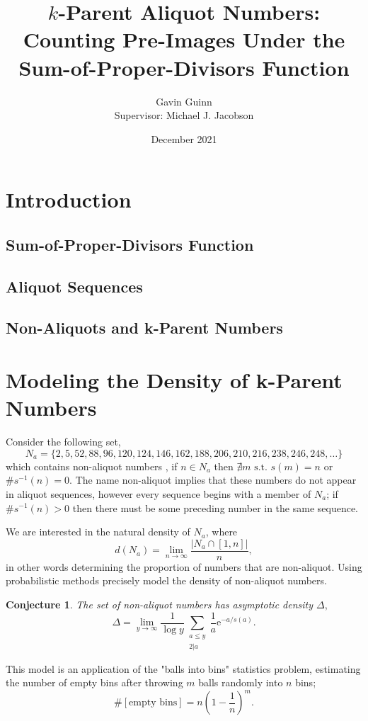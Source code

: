 \documentclass{article}
\title{$k$-Parent Aliquot Numbers: Counting Pre-Images Under the Sum-of-Proper-Divisors Function}
\author{Gavin Guinn\\{\small Supervisor: Michael J. Jacobson}}
\date{December 2021}
\theoremstyle{definition}
\newtheorem{conjecture}{Conjecture}[section]
\begin{document}
\maketitle

\section{Introduction}
\subsection{Sum-of-Proper-Divisors Function}
\subsection{Aliquot Sequences}
\subsection{Non-Aliquots and k-Parent Numbers}

\section{Modeling the Density of k-Parent Numbers}
Consider the following set,
$$N_a = \{2,5,52,88,96,120,124,146,162,188,206,210,216,238,246,248, \dots\}$$
which contains non-aliquot numbers \cite{sloane_2022}, if $n \in N_a$ then $\nexists m \text{ s.t. } s(m) = n$ or $\#s^{-1}(n) = 0$. The name non-aliquot implies that these numbers do not appear in aliquot sequences, however every sequence begins with a member of $N_a$; if $\#s^{-1}(n) > 0$ then there must be some preceding number in the same sequence.

We are interested in the natural density of $N_a$, where
$$d(N_a) = \lim_{n \to \infty}\frac{|N_a \cap[1,n]|}{n},$$
in other words determining the proportion of numbers that are non-aliquot. Using probabilistic methods \cite{pollPom} precisely model the density of non-aliquot numbers.
\begin{conjecture}{\textit{The set of non-aliquot numbers has asymptotic density $\Delta$},}
    $$\Delta = \lim_{y \to \infty}\frac{1}{\log y} \sum_{\substack{a\leq y \\ 2 | a}} \frac{1}{a}\text{e}^{-a/s(a)}.$$
\end{conjecture}

This model is an application of the "balls into bins" statistics problem, estimating the number of empty bins after throwing $m$ balls randomly into $n$ bins;
$$\#[\text{empty bins}] = n(1- \frac{1}{n})^m.$$
\end{document}
